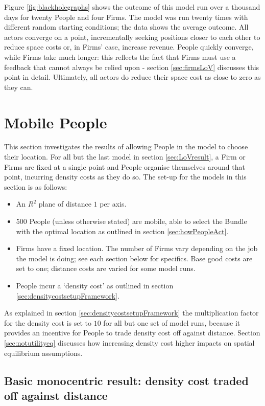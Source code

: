 Figure \ref{fig:blackholegraphs} shows the outcome of this model run over a thousand days for twenty People and four Firms. The model was run twenty times with different random starting conditions; the data shows the average outcome. All actors converge on a point, incrementally seeking positions closer to each other to reduce space costs or, in Firms' case, increase revenue. People quickly converge, while Firms take much longer: this reflects the fact that Firms must use a feedback that cannot always be relied upon - section \ref{sec:firmsLoV} discusses this point in detail. Ultimately, all actors do reduce their space cost as close to zero as they can.

\section{Mobile People \label{sec:results}}

This section investigates the results of allowing People in the model to choose their location. For all but the last model in section \ref{sec:LoVresult}, a Firm or Firms are fixed at a single point and People organise themselves around that point, incurring density costs as they do so. The set-up for the models in this section is as follows:

\begin{itemize}
	\item An $R^2$ plane of distance $1$ per axis.
	\item $500$ People (unless otherwise stated) are mobile, able to select the Bundle with the optimal location as outlined in section \ref{sec:howPeopleAct}.
\item Firms have a fixed location. The number of Firms vary depending on the job the model is doing; see each section below for specifics. Base good costs are set to one; distance costs are varied for some model runs.
	\item People incur a `density cost' as outlined in section \ref{sec:densitycostsetupFramework}.
\end{itemize}

As explained in section \ref{sec:densitycostsetupFramework} the multiplication factor for the density cost is set to $10$ for all but one set of model runs, because it provides an incentive for People to trade density cost off against distance. Section \ref{sec:notutilityeq} discusses how increasing density cost higher impacts on spatial equilibrium assumptions. 

\subsection{Basic monocentric result: density cost traded off against distance \label{sec:typicalmodeloutput}}

